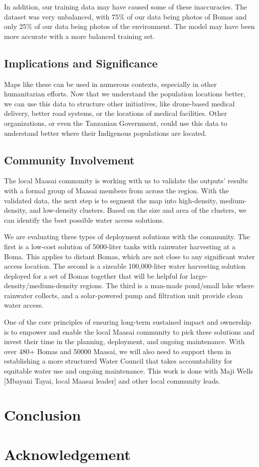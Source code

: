 \documentclass[10pt]{article}
\begin{document}
In addition, our training data may have caused some of these inaccuracies. The dataset was very unbalanced, with 75\% of our data being photos of Bomas and only 25\% of our data being photos of the environment. The model may have been more accurate with a more balanced training set.

\subsection{Implications and Significance}

Maps like these can be used in numerous contexts, especially in other humanitarian efforts. Now that we understand the population locations better, we can use this data to structure other initiatives, like drone-based medical delivery, better road systems, or the locations of medical facilities. Other organizations, or even the Tanzanian Government, could use this data to understand better where their Indigenous populations are located.

\subsection{Community Involvement}

The local Maasai community is working with us to validate the outputs' results with a formal group of Maasai members from across the region. With the validated data, the next step is to segment the map into high-density, medium-density, and low-density clusters. Based on the size and area of the clusters, we can identify the best possible water access solutions.

We are evaluating three types of deployment solutions with the community. The first is a low-cost solution of 5000-liter tanks with rainwater harvesting at a Boma. This applies to distant Bomas, which are not close to any significant water access location. The second is a sizeable 100,000-liter water harvesting solution deployed for a set of Bomas together that will be helpful for large-density/medium-density regions. The third is a man-made pond/small lake where rainwater collects, and a solar-powered pump and filtration unit provide clean water access.

One of the core principles of ensuring long-term sustained impact and ownership is to empower and enable the local Maasai community to pick these solutions and invest their time in the planning, deployment, and ongoing maintenance. With over 480+ Bomas and 50000 Maasai, we will also need to support them in establishing a more structured Water Council that takes accountability for equitable water use and ongoing maintenance. This work is done with Maji Wells [Mbayani Tayai, local Maasai leader] and other local community leads.



\section{Conclusion}

\section*{Acknowledgement}

\printbibliography
\end{document}
